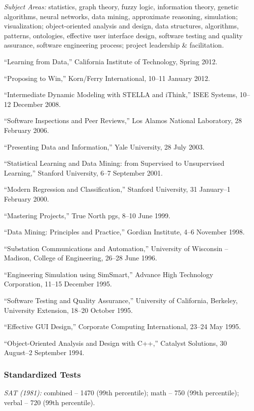 \documentclass[]{article}
\begin{document}
\emph{Subject Areas:} statistics, graph theory, fuzzy logic, information
theory, genetic algorithms, neural networks, data mining, approximate
reasoning, simulation; visualization; object-oriented analysis and
design, data structures, algorithms, patterns, ontologies, effective
user interface design, software testing and quality assurance, software
engineering process; project leadership \& facilitation.

``Learning from Data,'' California Institute of Technology, Spring 2012.

``Proposing to Win,'' Korn/Ferry International, 10--11 January 2012.

``Intermediate Dynamic Modeling with STELLA and iThink,'' ISEE Systems,
10--12 December 2008.

``Software Inspections and Peer Reviews,'' Los Alamos National
Laboratory, 28 February 2006.

``Presenting Data and Information,'' Yale University, 28 July 2003.

``Statistical Learning and Data Mining: from Supervised to Unsupervised
Learning,'' Stanford University, 6--7 September 2001.

``Modern Regression and Classification,'' Stanford University, 31
January--1 February 2000.

``Mastering Projects,'' True North pgs, 8--10 June 1999.

``Data Mining: Principles and Practice,'' Gordian Institute, 4--6
November 1998.

``Substation Communications and Automation,'' University of Wisconsin --
Madison, College of Engineering, 26--28 June 1996.

``Engineering Simulation using SimSmart,'' Advance High Technology
Corporation, 11--15 December 1995.

``Software Testing and Quality Assurance,'' University of California,
Berkeley, University Extension, 18--20 October 1995.

``Effective GUI Design,'' Corporate Computing International, 23--24 May
1995.

``Object-Oriented Analysis and Design with C++,'' Catalyst Solutions, 30
August--2 September 1994.

\subsubsection{Standardized Tests}\label{standardized-tests}

\emph{SAT (1981):} combined -- 1470 (99th percentile); math -- 750 (99th
percentile); verbal -- 720 (99th percentile).
\end{document}
